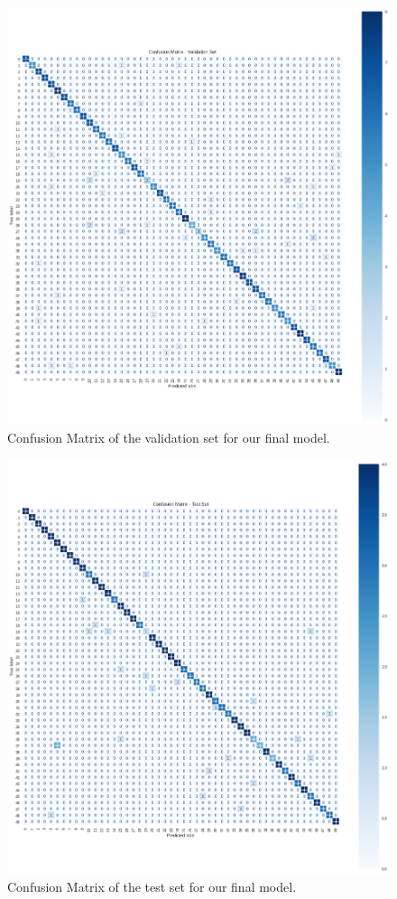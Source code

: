 \documentclass{article}
\begin{document}
\begin{sloppy}
\begin{figure}[ht]
  \centering
  \centerline{\includegraphics[width=\columnwidth]{Confusion_matrix_val.png}}
  \caption{Confusion Matrix of the validation set for our final model.}
  \label{fig:confusion_matrix_val}
\end{figure}

\begin{figure}[ht]
  \centering
  \centerline{\includegraphics[width=\columnwidth]{Confusion_matrix_test.png}}
  \caption{Confusion Matrix of the test set for our final model.}
  \label{fig:confusion_matrix_test}
\end{figure}



\end{sloppy}
\end{document}
